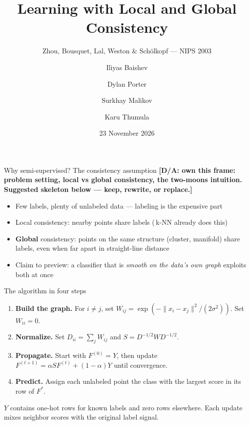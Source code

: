 \documentclass[10pt,aspectratio=169]{beamer}
\title[Group 28]{Learning with Local and Global Consistency}
\subtitle{Zhou, Bousquet, Lal, Weston \& Sch\"olkopf --- NIPS 2003}
\author{Iliyas Baishev \and Dylan Porter \and Surkhay Malikov \and Karu Thumula}
\institute{COMP3314 Machine Learning \quad HKU}
\date{23 November 2026}
\newcommand{\todo}[1]{\textcolor{lgcorange}{\textbf{[D/A: #1]}}}
\begin{document}
\begin{frame}
  \titlepage
\end{frame}

\begin{frame}{Why semi-supervised? The consistency assumption}
  \todo{own this frame: problem setting, local vs global consistency, the two-moons
  intuition. Suggested skeleton below --- keep, rewrite, or replace.}
  \vspace{0.5em}
  \begin{itemize}
    \item Few labels, plenty of unlabeled data --- labeling is the expensive part
    \item Local consistency: nearby points share labels (\,k-NN already does this)
    \item \textbf{Global} consistency: points on the same structure (cluster, manifold)
          share labels, even when far apart in straight-line distance
    \item Claim to preview: a classifier that is \emph{smooth on the data's own graph}
          exploits both at once
  \end{itemize}
\end{frame}

\begin{frame}{The algorithm in four steps}
  \begin{enumerate}
    \item \textbf{Build the graph.} For $i\ne j$, set
          $W_{ij}=\exp(-\lVert x_i-x_j\rVert^2/(2\sigma^2))$. Set $W_{ii}=0$.
    \item \textbf{Normalize.} Set $D_{ii}=\sum_j W_{ij}$ and
          $S=D^{-1/2}WD^{-1/2}$.
    \item \textbf{Propagate.} Start with $F^{(0)}=Y$, then update
          $F^{(t+1)}=\alpha SF^{(t)}+(1-\alpha)Y$ until convergence.
    \item \textbf{Predict.} Assign each unlabeled point the class with the
          largest score in its row of $F^*$.
  \end{enumerate}
  \smallskip
  {\small $Y$ contains one-hot rows for known labels and zero rows elsewhere.
  Each update mixes neighbor scores with the original label signal.}
\end{frame}
\end{document}
